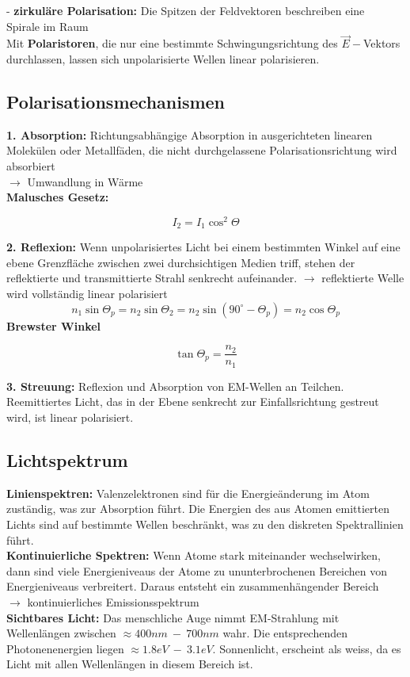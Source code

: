 - \textbf{zirkuläre Polarisation:} Die Spitzen der Feldvektoren beschreiben eine \\ \hspace{5mm} Spirale im Raum \\[2ex]

Mit \textbf{Polaristoren}, die nur eine bestimmte Schwingungsrichtung des $\Vec{E}-$Vektors durchlassen, lassen sich unpolarisierte Wellen linear polarisieren. \\[1ex]

\subsection{Polarisationsmechanismen}
\textbf{1. Absorption:} Richtungsabhängige Absorption in ausgerichteten linearen Molekülen oder Metallfäden, die nicht durchgelassene Polarisationsrichtung wird absorbiert \\ $\rightarrow$ Umwandlung in Wärme \\[1ex]
\textbf{Malusches Gesetz:}
\begin{formulabox}
    \[
        I_2 = I_1 \cos^2{\Theta}
    \]
\end{formulabox}

\textbf{2. Reflexion:} Wenn unpolarisiertes Licht bei einem bestimmten Winkel auf eine ebene Grenzfläche zwischen zwei durchsichtigen Medien triff, stehen der reflektierte und transmittierte Strahl senkrecht aufeinander. $\rightarrow$ reflektierte Welle wird vollständig linear polarisiert
\[
    n_1 \sin{\Theta_p} = n_2 \sin{\Theta_2} = n_2 \sin{(90^{\circ} - \Theta_p)} = n_2 \cos{\Theta_p}
\]
\textbf{Brewster Winkel}
\begin{formulabox}
    \[
        \tan{\Theta_p} = \frac{n_2}{n_1}
    \]
\end{formulabox}

\textbf{3. Streuung:} Reflexion und Absorption von EM-Wellen an Teilchen. Reemittiertes Licht, das in der Ebene senkrecht zur Einfallsrichtung gestreut wird, ist linear polarisiert.

\subsection{Lichtspektrum}
\textbf{Linienspektren:} Valenzelektronen sind für die Energieänderung im Atom zuständig, was zur Absorption führt. Die Energien des aus Atomen emittierten Lichts sind auf bestimmte Wellen beschränkt, was zu den diskreten Spektrallinien führt. \\[1ex]

\textbf{Kontinuierliche Spektren:} Wenn Atome stark miteinander wechselwirken, dann sind viele Energieniveaus der Atome zu ununterbrochenen Bereichen von Energieniveaus verbreitert. Daraus entsteht ein zusammenhängender Bereich \\
$\rightarrow$ kontinuierliches Emissionsspektrum \\[1ex]

\textbf{Sichtbares Licht:} Das menschliche Auge nimmt EM-Strahlung mit Wellenlängen zwischen $\approx 400nm \ - \ 700nm$ wahr. Die entsprechenden Photonenenergien liegen $\approx 1.8 eV \ - \ 3.1eV.$ Sonnenlicht, erscheint als weiss, da es Licht mit allen Wellenlängen in diesem Bereich ist.
